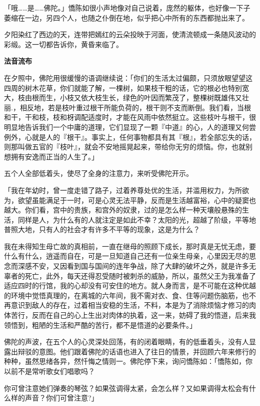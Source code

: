 \documentclass[twoside,openany]{book}
\newcommand{\mt}[1]{\textbullet \textbf{#1}}
\begin{document}
「哦……是……佛陀。」憍陈如很小声地像对自己说着，庞然的躯体，也好像一下子萎缩在一边，另四个人，也随之仆倒在地，似乎把心中所有的东西都抛出来了。

夕阳染红了西边的天，连带把嫣红的云朵投映于河面，使清流顿成一条随风波动的彩缎。这一切都告诉你，黄昏来临了。

\mt{法音流布}

在夕照中，佛陀用很缓慢的语调继续说：「你们的生活太过偏颇，只须放眼望望这四周的树木花草，你们就能了解，一棵树，如果枝干粗的话，它的根必也特别宽大，枝由根而生，小枝又依大枝生长，绿色的叶因而繁茂了，整棵树既雄伟又壮丽.，相反地，若是枝叶重过根干所能负荷的，根干则不支而断倒。我们看，当根和干，干和枝，枝和枒调配适度时，才能在风雨中依然挺立。这些枝叶与根干，很明显地告诉我们一个中庸的道理，它们显现了一颗『中道』的心，人的道理又何尝例外，心就是人的『根干』。事实上，任何事物都具有其『根』，若全部忘失的话，则那叫做五官的『枝叶』，就会不安地摇晃起来，带给你无穷的烦恼。你，也就别想拥有安逸而正当的人生了。」

五个人全部低着头，使尽了全身的注意力，来听受佛陀开示。

「我在年幼时，曾一度走错了路子，过着养尊处优的生活，并滥用权力，为所欲为，欲望虽能满足于一时，可是心灵无法平静，反而是生活越富裕，心中的疑窦也越大。你们看，宫中的贵族，和宫外的奴隶，过的是怎么样一种天壤般悬殊的生活，同样是人，为什么有的人就注定是如此不幸？太阳的光，超越了阶级，平等地普照大地，只有人的社会才有许多不平等的现象，这是为什么？

我在未得知生母亡故的真相前，一直在继母的照顾下成长，那时真是无忧无虑，要什么有什么，逍遥而自在，可是一旦知道自己还有一位亲生母亲，心里因无尽的思念而深感不安，又因看到国与国间的连年争战，除了大肆的破坏之外，就是许多无辜者的死亡，此外，每天还得忍受随时被刺杀的威胁，所以，虽然父王为我准备了适应四时的行馆，我的心却没有可安住的地方。就人身而言，是不可能在这种优越的环境中觉悟真理的，在离城的六年间，我不需对衣、食、住等问题伤脑筋，也不再意识到敌人的存在，过着相当安稳的生活，不料，本是为了消除烦恼才修习的肉体苦行，反而在自己的心上生出对肉体的执着，这一来，妨碍了我的悟道，后来我领悟到，粗陋的生活和严酷的苦行，都不是悟道的必要条件。」

佛陀的声波，在五个人的心灵深处回荡，有的闭着眼睛，有的低垂着头，没有人显露出辩驳的意图。他们跟着佛陀的话语也进入了往日的情景，并回顾六年来修行的种种，虽然思绪各异，然忏悔之情则一。佛陀停下来，询问憍陈如：「憍陈如，你以前不是常听歌女们唱歌吗？

你可曾注意她们弹奏的琴弦？如果弦调得太紧，会怎么样？又如果调得太松会有什么样的声音？你们可曾注意?」
\end{document}

